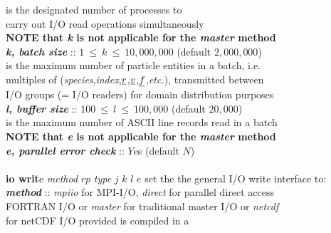 \begin{tabbing}
\>                                              \> \phantom{xxxx} is the designated number of processes to \\
\>                                              \> \phantom{xxxx} carry out I/O read operations simultaneously \\
\>                                              \> {\bf NOTE that {\em k} is not applicable for the {\em master} method} \\
\>                                              \> \phantom{xxx} {\bf \em k, batch size} :: $1~\le~k~\le~10,000,000$ (default $2,000,000$) \\
\>                                              \> \phantom{xxxx} is the maximum number of particle entities in a batch, i.e. \\
\>                                              \> \phantom{xxxx} multiples of ({\em species},{\em index},$\mbox{$\underline{r}$}$,$\mbox{$\underline{v}$}$,$\mbox{$\underline{f}$}$,{\em etc.}), transmitted between \\
\>                                              \> \phantom{xxxx} I/O groups (= I/O readers) for domain distribution purposes \\
\>                                              \> {\bf \em l, buffer size} :: $100~\le~l~\le~100,000$ (default $20,000$) \\
\>                                              \> \phantom{x} is the maximum number of ASCII line records read in a batch \\
\>                                              \> {\bf NOTE that {\em e} is not applicable for the {\em master} method} \\
\>                                              \> \phantom{xxx} {\bf \em e, parallel error check} :: $Y$es (default $N$) \\
\>                                              \> \\
  \> {\bf io writ}e {\em method} $rp$ {\em type} $j$ $k$ $l$ $e$ \> set the the general I/O write interface to: \\
\>                                              \> {\bf \em method} :: {\em mpiio} for MPI-I/O, {\em direct} for parallel direct access \\
\>                                              \> \phantom{x} FORTRAN I/O or {\em master} for traditional master I/O or {\em netcdf} \\
\>                                              \> \phantom{x} for netCDF I/O provided \D is compiled in a \\

\end{tabbing}
